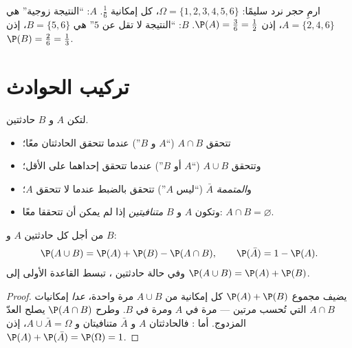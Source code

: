 \begin{example}\label{ex:g10:proba:die}
ارمِ حجر نرد سليمًا: $\Omega = \{1, 2, 3, 4, 5, 6\}$،  كل إمكانية
$\frac16$.  $A$: ``النتيجة زوجية'' هي
$A = \{2, 4, 6\}$، إذن $\P(A) = \frac36 = \frac12$.  $B$: ``النتيجة
لا تقل عن $5$'' هي $B = \{5, 6\}$، إذن $\P(B) = \frac26 =
\frac13$.
\end{example}

\section{تركيب الحوادث}

\begin{definition}\label{def:g10:proba:operations}
لتكن $A$ و $B$ حادثتين.
\begin{itemize}
  \item تتحقق $A \cap B$ (``$A$ و $B$'') عندما تتحقق الحادثتان معًا؛
  \item وتتحقق $A \cup B$ (``$A$ أو $B$'') عندما تتحقق إحداهما على الأقل؛
  \item و\emph{المتممة} $\bar A$ (``ليس $A$'')
        تتحقق بالضبط عندما لا تتحقق $A$؛
  \item وتكون $A$ و $B$ \emph{متنافيتين} إذا لم يمكن أن تتحققا
        معًا: $A \cap B = \varnothing$.
\end{itemize}
\end{definition}

\begin{theorem}\label{thm:g10:proba:addition}
من أجل كل حادثتين $A$ و $B$:
\[
\P(A \cup B) = \P(A) + \P(B) - \P(A \cap B),
\qquad
\P(\bar A) = 1 - \P(A) .
\]
وفي حالة حادثتين ، تبسط القاعدة الأولى إلى
$\P(A \cup B) = \P(A) + \P(B)$.
\end{theorem}

\begin{proof}
يضيف مجموع $\P(A) + \P(B)$  كل إمكانية من
$A \cup B$ مرة واحدة، \emph{عدا} إمكانيات $A \cap B$ التي تُحسب
مرتين --- مرة في $A$ ومرة في $B$. وطرح $\P(A \cap B)$ يصلح
العدّ المزدوج. أما : فالحادثتان $A$ و $\bar A$ متنافيتان
و $A \cup \bar A = \Omega$، إذن $\P(A) + \P(\bar A) = \P(\Omega) = 1$.
\end{proof}


